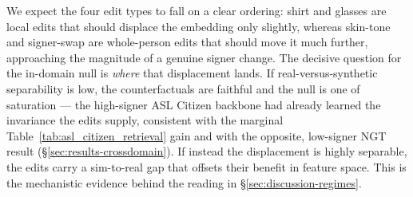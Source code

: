 We expect the four edit types to fall on a clear ordering: shirt and glasses
are local edits that should displace the embedding only slightly, whereas
skin-tone and signer-swap are whole-person edits that should move it much
further, approaching the magnitude of a genuine signer change. The decisive
question for the in-domain null is \emph{where} that displacement lands. If
real-versus-synthetic separability is low, the counterfactuals are faithful and the null is one of
saturation --- the high-signer ASL Citizen backbone had already learned the
invariance the edits supply, consistent with the marginal
Table~\ref{tab:asl_citizen_retrieval} gain and with the opposite,
low-signer NGT result (\S\ref{sec:results-crossdomain}). If instead the
displacement is highly separable, the edits
carry a sim-to-real gap that offsets their benefit in feature space. This is
the mechanistic evidence behind the reading in
\S\ref{sec:discussion-regimes}.
